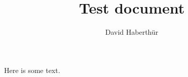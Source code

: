 \documentclass{article}
\title{Test document}
\author{David Haberthür}
\date{}
\begin{document}
\maketitle

Here is some text.
\end{document}
